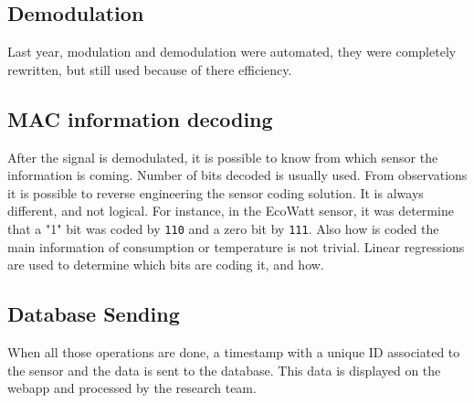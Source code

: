 \subsection{Demodulation}
Last year, modulation and demodulation were automated, they were completely rewritten, but still used because of there efficiency.

\subsection{MAC information decoding}
After the signal is demodulated, it is possible to know from which sensor the information is coming. Number of bits decoded is usually used.
From observations it is possible to reverse engineering the sensor coding solution. It is always different, and not logical. For instance, in the EcoWatt sensor, it was determine that a "1" bit was coded by \texttt{110} and a zero bit by \texttt{111}. Also how is coded the main information of consumption or temperature is not trivial. Linear regressions are used to determine which bits are coding it, and how.

\subsection{Database Sending}
When all those operations are done, a timestamp with a unique ID associated to the sensor and the data is sent to the database. This data is displayed on the webapp and processed by the research team.

